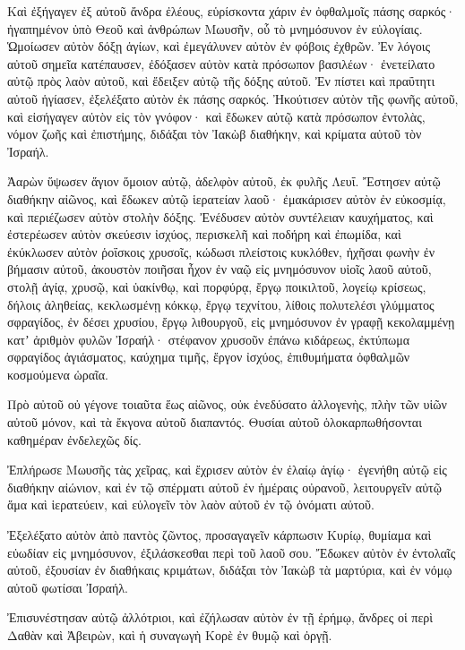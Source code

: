 {Καὶ ἐξήγαγεν ἐξ αὐτοῦ ἄνδρα ἐλέους, εὑρίσκοντα χάριν ἐν ὀφθαλμοῖς πάσης σαρκός· ἠγαπημένον ὑπὸ Θεοῦ καὶ ἀνθρώπων Μωυσῆν, οὗ τὸ μνημόσυνον ἐν εὐλογίαις.
Ὡμοίωσεν αὐτὸν δόξῃ ἁγίων, καὶ ἐμεγάλυνεν αὐτὸν ἐν φόβοις ἐχθρῶν.
Ἐν λόγοις αὐτοῦ σημεῖα κατέπαυσεν, ἐδόξασεν αὐτὸν κατὰ πρόσωπον βασιλέων· ἐνετείλατο αὐτῷ πρὸς λαὸν αὐτοῦ, καὶ ἔδειξεν αὐτῷ τῆς δόξης αὐτοῦ.
Ἐν πίστει καὶ πραΰτητι αὐτοῦ ἡγίασεν, ἐξελέξατο αὐτὸν ἐκ πάσης σαρκός.
Ἠκούτισεν αὐτὸν τῆς φωνῆς αὐτοῦ, καὶ εἰσήγαγεν αὐτὸν εἰς τὸν γνόφον· καὶ ἔδωκεν αὐτῷ κατὰ πρόσωπον ἐντολὰς, νόμον ζωῆς καὶ ἐπιστήμης, διδάξαι τὸν Ἰακὼβ διαθήκην, καὶ κρίματα αὐτοῦ τὸν Ἰσραήλ.
\par }{\PP {}Ἀαρὼν ὕψωσεν ἅγιον ὅμοιον αὐτῷ, ἀδελφὸν αὐτοῦ, ἐκ φυλῆς Λευΐ.
Ἔστησεν αὐτῷ διαθήκην αἰῶνος, καὶ ἔδωκεν αὐτῷ ἱερατείαν λαοῦ· ἐμακάρισεν αὐτὸν ἐν εὐκοσμίᾳ, καὶ περιέζωσεν αὐτὸν στολὴν δόξης.
Ἐνέδυσεν αὐτὸν συντέλειαν καυχήματος, καὶ ἐστερέωσεν αὐτὸν σκεύεσιν ἰσχύος, περισκελῆ καὶ ποδήρη καὶ ἐπωμίδα,
καὶ ἐκύκλωσεν αὐτὸν ῥοΐσκοις χρυσοῖς, κώδωσι πλείστοις κυκλόθεν, ἠχῆσαι φωνὴν ἐν βήμασιν αὐτοῦ, ἀκουστὸν ποιῆσαι ἦχον ἐν ναῷ εἰς μνημόσυνον υἱοῖς λαοῦ αὐτοῦ,
στολῇ ἁγίᾳ, χρυσῷ, καὶ ὑακίνθῳ, καὶ πορφύρᾳ, ἔργῳ ποικιλτοῦ, λογείῳ κρίσεως, δήλοις ἀληθείας,
κεκλωσμένῃ κόκκῳ, ἔργῳ τεχνίτου, λίθοις πολυτελέσι γλύμματος σφραγίδος, ἐν δέσει χρυσίου, ἔργῳ λιθουργοῦ, εἰς μνημόσυνον ἐν γραφῇ κεκολαμμένῃ κατʼ ἀριθμὸν φυλῶν Ἰσραήλ·
στέφανον χρυσοῦν ἐπάνω κιδάρεως, ἐκτύπωμα σφραγίδος ἁγιάσματος, καύχημα τιμῆς, ἔργον ἰσχύος, ἐπιθυμήματα ὀφθαλμῶν κοσμούμενα ὡραῖα.
\par }{\PP {}Πρὸ αὐτοῦ οὐ γέγονε τοιαῦτα ἕως αἰῶνος, οὐκ ἐνεδύσατο ἀλλογενὴς, πλὴν τῶν υἱῶν αὐτοῦ μόνον, καὶ τὰ ἔκγονα αὐτοῦ διαπαντός.
Θυσίαι αὐτοῦ ὁλοκαρπωθήσονται καθημέραν ἐνδελεχῶς δίς.
\par }{\PP {}Ἐπλήρωσε Μωυσῆς τὰς χεῖρας, καὶ ἔχρισεν αὐτὸν ἐν ἐλαίῳ ἁγίῳ· ἐγενήθη αὐτῷ εἰς διαθήκην αἰώνιον, καὶ ἐν τῷ σπέρματι αὐτοῦ ἐν ἡμέραις οὐρανοῦ, λειτουργεῖν αὐτῷ ἅμα καὶ ἱερατεύειν, καὶ εὐλογεῖν τὸν λαὸν αὐτοῦ ἐν τῷ ὀνόματι αὐτοῦ.
\par }{\PP {}Ἐξελέξατο αὐτὸν ἀπὸ παντὸς ζῶντος, προσαγαγεῖν κάρπωσιν Κυρίῳ, θυμίαμα καὶ εὐωδίαν εἰς μνημόσυνον, ἐξιλάσκεσθαι περὶ τοῦ λαοῦ σου.
Ἔδωκεν αὐτὸν ἐν ἐντολαῖς αὐτοῦ, ἐξουσίαν ἐν διαθήκαις κριμάτων, διδάξαι τὸν Ἰακὼβ τὰ μαρτύρια, καὶ ἐν νόμῳ αὐτοῦ φωτίσαι Ἰσραήλ.
\par }{\PP {}Ἐπισυνέστησαν αὐτῷ ἀλλότριοι, καὶ ἐζήλωσαν αὐτὸν ἐν τῇ ἐρήμῳ, ἄνδρες οἱ περὶ Δαθὰν καὶ Ἀβειρὼν, καὶ ἡ συναγωγὴ Κορὲ ἐν θυμῷ καὶ ὀργῇ.
}
